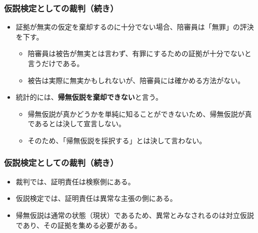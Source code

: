 
\begin{frame}[shrink=15]
\frametitle{仮説検定としての裁判（続き）}

\begin{itemize}

\item 証拠が無実の仮定を棄却するのに十分でない場合、陪審員は「無罪」の評決を下す。
\begin{itemize}
\item 陪審員は被告が無実とは言わず、有罪にするための証拠が十分でないと言うだけである。
\item 被告は実際に無実かもしれないが、陪審員には確かめる方法がない。
\end{itemize}

\item 統計的には、\textbf{帰無仮説を棄却できない}と言う。
\begin{itemize}
\item 帰無仮説が真かどうかを単純に知ることができないため、帰無仮説が真であるとは決して宣言しない。
\item そのため、「帰無仮説を採択する」とは決して言わない。
\end{itemize}

\end{itemize}

\end{frame}


\begin{frame}
\frametitle{仮説検定としての裁判（続き）}

\begin{itemize}

\item 裁判では、証明責任は検察側にある。

\item 仮説検定では、証明責任は異常な主張の側にある。

\item 帰無仮説は通常の状態（現状）であるため、異常とみなされるのは対立仮説であり、その証拠を集める必要がある。

\end{itemize}

\end{frame}


